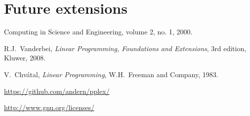 \documentclass[ukenglish]{nik}
\begin{document}
\section{Future extensions}\label{sec:future}





\begin{thebibliography}{99}
 Computing in Science and Engineering, volume 2, no. 1, 2000.

 R.J.~Vanderbei, 
\emph{Linear Programming, Foundations and Extensions},
3rd edition, Kluwer, 2008.

 V.~Chv\'atal,
\emph{Linear Programming},
W.H.~Freeman and Company, 1983.

\url{https://github.com/andern/pplex/}

\url{http://www.gnu.org/licenses/}

\end{thebibliography}
\end{document}
